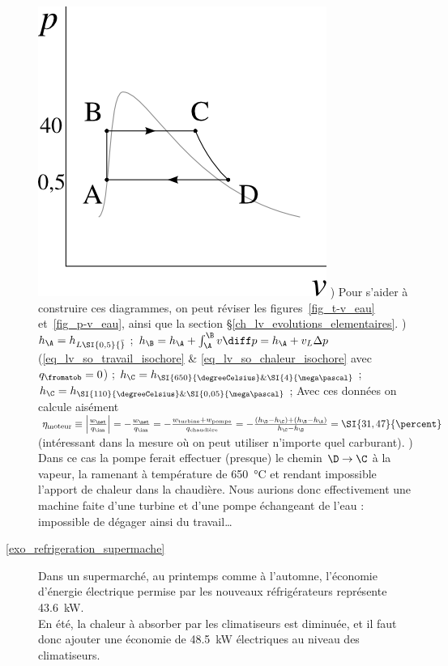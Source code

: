 \begin{description}
			\includegraphics[height=\solutiondiagramwidth]{images/exo_sol_pv_moteur_vapeur.png}
			) Pour s’aider à construire ces diagrammes, on peut réviser les figures~\ref{fig_t-v_eau} et~\ref{fig_p-v_eau}, ainsi que la section \S\ref{ch_lv_evolutions_elementaires}.
			)	$h_\A = h_{L \SI{0,5}{\bar}}$ ; 
						$h_\B = h_\A + \int_\A^\B v \diff p = h_\A + v_L \Delta p $ (\ref{eq_lv_so_travail_isochore} \& \ref{eq_lv_so_chaleur_isochore} avec $q_\fromatob = 0$) ;
						$h_\C = h_{\SI{650}{\degreeCelsius} \& \SI{4}{\mega\pascal}}$ ;
						$h_\C = h_{\SI{110}{\degreeCelsius} \& \SI{0,05}{\mega\pascal}}$ ;
						Avec ces données on calcule aisément $\eta_\text{moteur} \equiv \left|\frac{w_\net}{q_\inn}\right| = -\frac{w_\net}{q_\inn} = -\frac{w_\text{turbine} + w_\text{pompe}}{q_\text{chaudière}} = -\frac{(h_\D - h_\C) + (h_\B - h_\A)}{h_\C - h_\B} = \SI{31,47}{\percent}$ (intéressant dans la mesure où on peut utiliser n’importe quel carburant).
			\tab{}) Dans ce cas la pompe ferait effectuer (presque) le chemin $\D \to \C$ à la vapeur, la ramenant à température de \SI{650}{\degreeCelsius} et rendant impossible l’apport de chaleur dans la chaudière. Nous aurions donc effectivement une machine faite d’une turbine et d’une pompe échangeant de l’eau : impossible de dégager ainsi du travail…
	\item [\ref{exo_refrigeration_supermache}] 
			\tab Dans un supermarché, au printemps comme à l’automne, l’économie d’énergie électrique permise par les nouveaux réfrigérateurs représente \SI{43,6}{\kilo\watt}.\\
			En été, la chaleur à absorber par les climatiseurs est diminuée, et il faut donc ajouter une économie de \SI{48,5}{\kilo\watt} électriques au niveau des climatiseurs.\\

\end{description}
